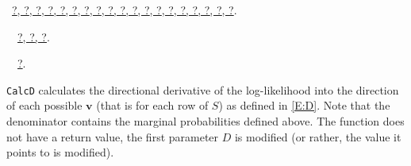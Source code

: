 \documentclass[reqno]{amsart}
\renewcommand{\NWlink}[2]{\hyperlink{#1}{#2}}
\newcommand{\bv}{\mathbf{v}}
\begin{document}
\begin{flushleft}
\begin{list}{}{}
\mbox{}\verb@@{\NWsep}
\end{list}
\vspace{-1.5ex}
\footnotesize
\begin{list}{}{\setlength{\itemsep}{-\parsep}\setlength{\itemindent}{-\leftmargin}}
\item \NWtxtFileDefBy\ \NWlink{nuweb?}{?}\NWlink{nuweb?}{, ?}\NWlink{nuweb?}{, ?}\NWlink{nuweb?}{, ?}\NWlink{nuweb?}{, ?}\NWlink{nuweb?}{, ?}\NWlink{nuweb?}{, ?}\NWlink{nuweb?}{, ?}\NWlink{nuweb?}{, ?}\NWlink{nuweb?}{, ?}\NWlink{nuweb?}{, ?}\NWlink{nuweb?}{, ?}\NWlink{nuweb?}{, ?}\NWlink{nuweb?}{, ?}\NWlink{nuweb?}{, ?}\NWlink{nuweb?}{, ?}\NWlink{nuweb?}{, ?}\NWlink{nuweb?}{, ?}\NWlink{nuweb?}{, ?}.
\item \NWtxtIdentsDefed\nobreak\  \verb@CalcMarginals@\nobreak\ \NWlink{nuweb?}{?}\NWlink{nuweb?}{, ?}\NWlink{nuweb?}{, ?}.\item \NWtxtIdentsUsed\nobreak\  \verb@HyperTable@\nobreak\ \NWlink{nuweb?}{?}.
\item{}
\end{list}
\vspace{4ex}
\end{flushleft}
\texttt{CalcD} calculates the directional derivative of the log-likelihood into
the direction of each possible $\bv$ (that is for each row of $S$) as defined
in \eqref{E:D}. Note that the denominator contains the marginal probabilities 
defined above. The function does not have a return value, the first parameter 
$D$ is modified (or rather, the value it points to is modified).
\end{document}
